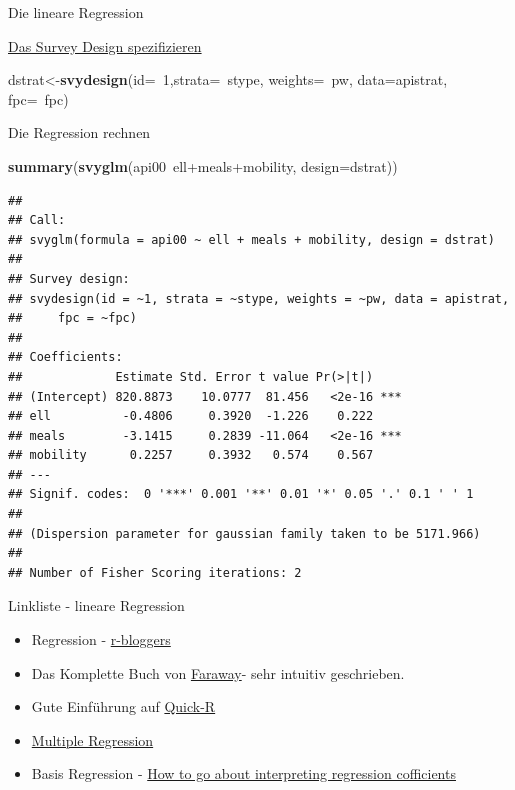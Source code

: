 \documentclass[ignorenonframetext,]{beamer}
\newenvironment{Shaded}{}{}
\newcommand{\KeywordTok}[1]{\textcolor[rgb]{0.00,0.44,0.13}{\textbf{{#1}}}}
\newcommand{\DataTypeTok}[1]{\textcolor[rgb]{0.56,0.13,0.00}{{#1}}}
\newcommand{\DecValTok}[1]{\textcolor[rgb]{0.25,0.63,0.44}{{#1}}}
\newcommand{\NormalTok}[1]{{#1}}
\begin{document}
\begin{frame}[fragile]{Die lineare Regression}
\begin{block}{\href{https://www.r-bloggers.com/linear-models-with-weighted-observations/}{Das
Survey Design spezifizieren}}
\begin{Shaded}
\begin{Highlighting}[]
\NormalTok{dstrat<-}\KeywordTok{svydesign}\NormalTok{(}\DataTypeTok{id=}\NormalTok{~}\DecValTok{1}\NormalTok{,}\DataTypeTok{strata=}\NormalTok{~stype, }\DataTypeTok{weights=}\NormalTok{~pw, }
                  \DataTypeTok{data=}\NormalTok{apistrat, }\DataTypeTok{fpc=}\NormalTok{~fpc)}
\end{Highlighting}
\end{Shaded}

\begin{block}{Die Regression rechnen}

\begin{Shaded}
\begin{Highlighting}[]
\KeywordTok{summary}\NormalTok{(}\KeywordTok{svyglm}\NormalTok{(api00~ell+meals+mobility, }
               \DataTypeTok{design=}\NormalTok{dstrat))}
\end{Highlighting}
\end{Shaded}

\begin{verbatim}
## 
## Call:
## svyglm(formula = api00 ~ ell + meals + mobility, design = dstrat)
## 
## Survey design:
## svydesign(id = ~1, strata = ~stype, weights = ~pw, data = apistrat, 
##     fpc = ~fpc)
## 
## Coefficients:
##             Estimate Std. Error t value Pr(>|t|)    
## (Intercept) 820.8873    10.0777  81.456   <2e-16 ***
## ell          -0.4806     0.3920  -1.226    0.222    
## meals        -3.1415     0.2839 -11.064   <2e-16 ***
## mobility      0.2257     0.3932   0.574    0.567    
## ---
## Signif. codes:  0 '***' 0.001 '**' 0.01 '*' 0.05 '.' 0.1 ' ' 1
## 
## (Dispersion parameter for gaussian family taken to be 5171.966)
## 
## Number of Fisher Scoring iterations: 2
\end{verbatim}

\end{block}

\end{block}

\begin{block}{Linkliste - lineare Regression}

\begin{itemize}
\item
  Regression -
  \href{http://www.r-bloggers.com/r-tutorial-series-simple-linear-regression/}{r-bloggers}
\item
  Das Komplette Buch von
  \href{http://cran.r-project.org/doc/contrib/Faraway-PRA.pdf}{Faraway}-
  sehr intuitiv geschrieben.
\item
  Gute Einführung auf
  \href{http://www.statmethods.net/stats/regression.html}{Quick-R}
\item
  \href{https://www.r-bloggers.com/multiple-regression-part-1/}{Multiple
  Regression}
\item
  Basis Regression -
  \href{https://www.r-bloggers.com/how-to-go-about-interpreting-regression-cofficients/}{How
  to go about interpreting regression cofficients}
\end{itemize}


\end{block}
\end{frame}
\end{document}
